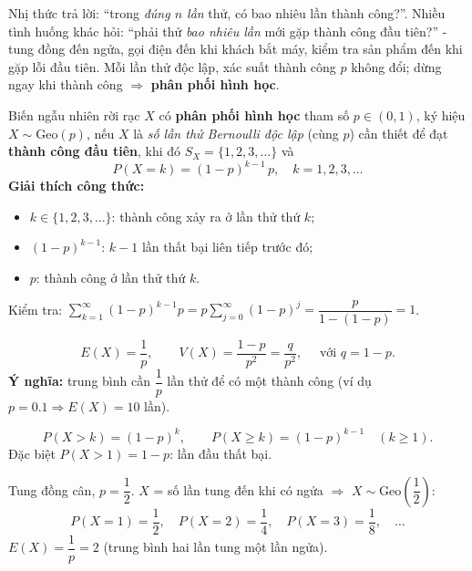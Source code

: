 \documentclass[12pt,a4paper]{article}
\begin{document}
\begin{dongco}[title={Động cơ - Chờ thành công đầu tiên}]
Nhị thức trả lời: ``trong \emph{đúng $n$ lần} thử, có bao nhiêu lần thành công?''. Nhiều tình huống khác hỏi: ``phải thử \emph{bao nhiêu lần} mới gặp thành công đầu tiên?'' - tung đồng đến ngửa, gọi điện đến khi khách bắt máy, kiểm tra sản phẩm đến khi gặp lỗi đầu tiên. Mỗi lần thử độc lập, xác suất thành công $p$ không đổi; dừng ngay khi thành công $\Rightarrow$ \textbf{phân phối hình học}.
\end{dongco}

\begin{dinhnghia}
  Biến ngẫu nhiên rời rạc $X$ có \textbf{phân phối hình học} tham số $p \in (0,1)$, ký hiệu $X \sim \mathrm{Geo}(p)$, nếu $X$ là \emph{số lần thử Bernoulli độc lập} (cùng $p$) cần thiết để đạt \textbf{thành công đầu tiên}, khi đó $S_X = \{1, 2, 3, \ldots\}$ và
  \[
    P(X = k) = (1-p)^{k-1}\,p, \quad k = 1, 2, 3, \ldots
  \]
  \textbf{Giải thích công thức:}
  \begin{itemize}
    \item $k \in \{1,2,3,\ldots\}$: thành công xảy ra ở lần thử thứ $k$;
    \item $(1-p)^{k-1}$: $k-1$ lần thất bại liên tiếp trước đó;
    \item $p$: thành công ở lần thử thứ $k$.
  \end{itemize}
  Kiểm tra: $\displaystyle\sum_{k=1}^{\infty} (1-p)^{k-1} p = p \sum_{j=0}^{\infty} (1-p)^j = \dfrac{p}{1-(1-p)} = 1$.
\end{dinhnghia}

\begin{dinhly}
  \[
    E(X) = \dfrac{1}{p}, \qquad V(X) = \dfrac{1-p}{p^2} = \dfrac{q}{p^2}, \quad \text{ với } q = 1-p.
  \]
  \textbf{Ý nghĩa:} trung bình cần $\dfrac{1}{p}$ lần thử để có một thành công (ví dụ $p = 0.1 \Rightarrow E(X) = 10$ lần).
\end{dinhly}

\begin{dinhly}[title={Xác suất ``chờ lâu hơn $k$ lần''}]
  \[
    P(X > k) = (1-p)^k, \qquad
    P(X \ge k) = (1-p)^{k-1} \quad (k \ge 1).
  \]
  Đặc biệt $P(X > 1) = 1-p$: lần đầu thất bại.
\end{dinhly}

\begin{vidu}[title={Tung đồng đến mặt ngửa}]
Tung đồng cân, $p = \dfrac{1}{2}$. $X$ = số lần tung đến khi có ngửa $\Rightarrow$ $X \sim \mathrm{Geo}(\dfrac{1}{2})$:
\[
  P(X = 1) = \dfrac{1}{2}, \quad
  P(X = 2) = \dfrac{1}{4}, \quad
  P(X = 3) = \dfrac{1}{8}, \quad \ldots
\]
$E(X) = \dfrac{1}{p} = 2$ (trung bình hai lần tung một lần ngửa).
\end{vidu}
\end{document}
